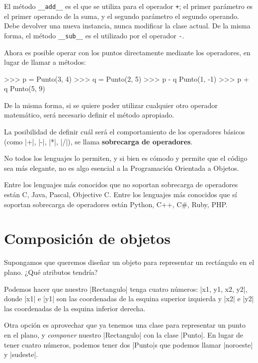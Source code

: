 El método \lstinline!__add__! es el que se utiliza para el operador
\lstinline!+!; el primer parámetro es el primer operando de la suma, y el
segundo parámetro el segundo operando.  Debe devolver una nueva instancia,
nunca modificar la clase actual.  De la misma forma, el método
\lstinline!__sub__! es el utilizado por el operador \lstinline!-!.

Ahora es posible operar con los puntos directamente mediante los
operadores, en lugar de llamar a métodos:

\begin{codigo-python-sn}
>>> p = Punto(3, 4)
>>> q = Punto(2, 5)
>>> p - q
Punto(1, -1)
>>> p + q
Punto(5, 9)
\end{codigo-python-sn}

De la misma forma, si se quiere poder utilizar cualquier otro operador
matemático, será necesario definir el método apropiado.

\label{sobrecarga}
\begin{sabias_que}
La posibilidad de definir cuál será el comportamiento de los operadores
básicos (como |+|, |-|, |*|, |/|), se llama {\bf sobrecarga de
operadores}.

No todos los lenguajes lo permiten, y si bien es cómodo y permite que el
código sea más elegante, no es algo esencial a la Programación Orientada a
Objetos.

Entre los lenguajes más conocidos que no soportan sobrecarga de operadores
están C, Java, Pascal, Objective C.  Entre los lenguajes más conocidos que
sí soportan sobrecarga de operadores están Python, C++, C\#, Ruby, PHP.
\end{sabias_que}

\section{Composición de objetos}

Supongamos que queremos diseñar un objeto para representar un rectángulo en el
plano. ¿Qué atributos tendría?

Podemos hacer que nuestro |Rectangulo| tenga cuatro números: |x1, y1, x2, y2|,
donde |x1| e |y1| son las coordenadas de la esquina superior izquierda y |x2| e
|y2| las coordenadas de la esquina inferior derecha.

Otra opción es aprovechar que ya tenemos una clase para representar un punto en
el plano, y \emph{componer} nuestro |Rectangulo| con la clase |Punto|. En lugar
de tener cuatro números, podemos tener dos |Punto|s que podemos llamar
|noroeste| y |sudeste|.

